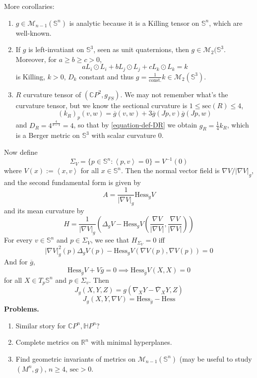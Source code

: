 More corollaries:
\begin{lemma}
\label{lemma-corollaries2}
\begin{enumerate}
\item $g\in\mathcal{M}_{n-1}(\mathbb{S}^n)$ is analytic because it is a Killing
tensor on $\mathbb{S}^n$, which are well-known.
\item If $g$ is left-invatiant on $\mathbb{S}^3$, seen as unit quaternions, then
$g\in\mathcal{M}_2(\mathbb{S}^3$. Moreover, for $a\geq b\geq c>0$,
$$
aL_i\odot L_i+bL_j\odot L_j+cL_k\odot L_k=k
$$
is Killing, $k>0$,  $D_k$ constant and thus $g=\frac{1}{\text{const.}}k
\in\mathcal{M}_2(\mathbb{S}^3)$.
\item $R$ curvature tensor of $(\mathbb{C}P^{2},g_{FS})$. We may not remember
what's the curvature tensor, but we know the sectional curvature is $1\leq
\text{sec}(R)\leq 4$,
$$
(k_R)_p(v,w)=\overline{g}(v,w)+3\overline{g}(Jp,v)\overline{g}(Jp,w)
$$
and $D_R=4^{\frac{4}{3-1}}=4$, so that by \ref{equation-def-DR} we obtain 
$g_R=\frac{1}{4}k_R$, which is a Berger
metric on $\mathbb{S}^3$ with scalar curvature 0.
\end{enumerate}
\end{lemma}

\bigskip
Now define
$$
\Sigma_V=\{p\in\mathbb{S}^n:\left<p,v\right>=0\}=V^{-1}(0)
$$
where $V(x):=\left<x,v\right>$ for all $x\in\mathbb{S}^n$. Then the normal
vector field is $\nabla V/|\nabla V|_g$, and the second fundamental form is
given by
$$
A=\frac{1}{|\nabla V|_g}\text{Hess}_gV
$$
and its mean curvature by
\begin{equation}
\label{equation-mean-curvature-for-level-sets-V}
H=\frac{1}{|\nabla V|_g}\left(\Delta_gV-\text{Hess}_gV\left(\frac{\nabla
V}{|\nabla V|},\frac{\nabla V}{|\nabla V|}\right)\right)
\end{equation}
For every $v \in \mathbb{S}^n$ and $p\in\Sigma_V$, we see that $H_{\Sigma_V}=0$
iff
$$
|\nabla V|^2_g(p)\Delta_gV(p)-\text{Hess}_gV(\nabla V(p),\nabla V(p))=0
$$
And for $\overline{g}$,
$$
\text{Hess}_{\overline{g}}V+V\overline{g}=0\implies
\text{Hess}_{\overline{g}}V(X,X)=0
$$
for all $X\in T_p\mathbb{S}^n$ and $p\in\Sigma_v$. Then
$$
J_g(X,Y,Z)=g(\nabla_XY-\overline{\nabla}_XY,Z)
$$
$$
J_g(X,Y,\nabla V)=\text{Hess}_{\overline{g}}-\text{Hess}
$$
{\bf Problems.}
\begin{enumerate}
\item Similar story for $\mathbb{C}P^{n},\mathbb{H}P^n$?
\item Complete metrics on $\mathbb{R}^n$ with minimal hyperplanes.
\item Find geometric invariants of metrics on $\mathcal{M}_{n-1}(\mathbb{S}^n)$
(may be useful to study $(M^n,g)$, $n\geq 4$, $\text{sec}>0$.
\end{enumerate}

